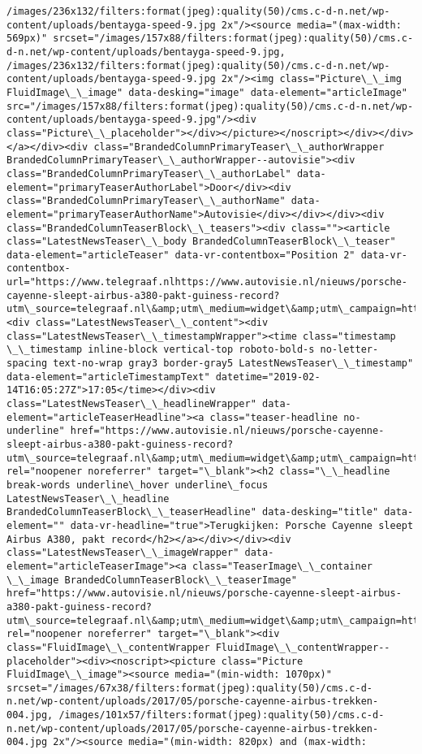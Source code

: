 \documentclass[11pt]{article}
\begin{document}
\begin{Verbatim}[commandchars=\\\{\}]
/images/236x132/filters:format(jpeg):quality(50)/cms.c-d-n.net/wp-content/uploads/bentayga-speed-9.jpg 2x"/><source media="(max-width: 569px)" srcset="/images/157x88/filters:format(jpeg):quality(50)/cms.c-d-n.net/wp-content/uploads/bentayga-speed-9.jpg, /images/236x132/filters:format(jpeg):quality(50)/cms.c-d-n.net/wp-content/uploads/bentayga-speed-9.jpg 2x"/><img class="Picture\_\_img FluidImage\_\_image" data-desking="image" data-element="articleImage" src="/images/157x88/filters:format(jpeg):quality(50)/cms.c-d-n.net/wp-content/uploads/bentayga-speed-9.jpg"/><div class="Picture\_\_placeholder"></div></picture></noscript></div></div></a></div><div class="BrandedColumnPrimaryTeaser\_\_authorWrapper BrandedColumnPrimaryTeaser\_\_authorWrapper--autovisie"><div class="BrandedColumnPrimaryTeaser\_\_authorLabel" data-element="primaryTeaserAuthorLabel">Door</div><div class="BrandedColumnPrimaryTeaser\_\_authorName" data-element="primaryTeaserAuthorName">Autovisie</div></div></div><div class="BrandedColumnTeaserBlock\_\_teasers"><div class=""><article class="LatestNewsTeaser\_\_body BrandedColumnTeaserBlock\_\_teaser" data-element="articleTeaser" data-vr-contentbox="Position 2" data-vr-contentbox-url="https://www.telegraaf.nlhttps://www.autovisie.nl/nieuws/porsche-cayenne-sleept-airbus-a380-pakt-guiness-record?utm\_source=telegraaf.nl\&amp;utm\_medium=widget\&amp;utm\_campaign=https://www.telegraaf.nl/"><div class="LatestNewsTeaser\_\_content"><div class="LatestNewsTeaser\_\_timestampWrapper"><time class="timestamp \_\_timestamp inline-block vertical-top roboto-bold-s no-letter-spacing text-no-wrap gray3 border-gray5 LatestNewsTeaser\_\_timestamp" data-element="articleTimestampText" datetime="2019-02-14T16:05:27Z">17:05</time></div><div class="LatestNewsTeaser\_\_headlineWrapper" data-element="articleTeaserHeadline"><a class="teaser-headline no-underline" href="https://www.autovisie.nl/nieuws/porsche-cayenne-sleept-airbus-a380-pakt-guiness-record?utm\_source=telegraaf.nl\&amp;utm\_medium=widget\&amp;utm\_campaign=https://www.telegraaf.nl/" rel="noopener noreferrer" target="\_blank"><h2 class="\_\_headline break-words underline\_hover underline\_focus LatestNewsTeaser\_\_headline BrandedColumnTeaserBlock\_\_teaserHeadline" data-desking="title" data-element="" data-vr-headline="true">Terugkijken: Porsche Cayenne sleept Airbus A380, pakt record</h2></a></div></div><div class="LatestNewsTeaser\_\_imageWrapper" data-element="articleTeaserImage"><a class="TeaserImage\_\_container \_\_image BrandedColumnTeaserBlock\_\_teaserImage" href="https://www.autovisie.nl/nieuws/porsche-cayenne-sleept-airbus-a380-pakt-guiness-record?utm\_source=telegraaf.nl\&amp;utm\_medium=widget\&amp;utm\_campaign=https://www.telegraaf.nl/" rel="noopener noreferrer" target="\_blank"><div class="FluidImage\_\_contentWrapper FluidImage\_\_contentWrapper--placeholder"><div><noscript><picture class="Picture FluidImage\_\_image"><source media="(min-width: 1070px)" srcset="/images/67x38/filters:format(jpeg):quality(50)/cms.c-d-n.net/wp-content/uploads/2017/05/porsche-cayenne-airbus-trekken-004.jpg, /images/101x57/filters:format(jpeg):quality(50)/cms.c-d-n.net/wp-content/uploads/2017/05/porsche-cayenne-airbus-trekken-004.jpg 2x"/><source media="(min-width: 820px) and (max-width: 
\end{Verbatim}
\end{document}
